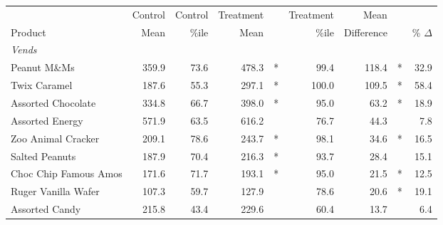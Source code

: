 \documentclass[aspectratio=169,11pt]{beamer}
\begin{document}
\begin{frame}
\begin{table}
\begin{center}
\tiny
\label{tab:nonparam}
\begin{tabular}{|l|rrrcrrcr|}
\hline
 & Control  & Control & Treatment& \hspace{-0.3in}& Treatment & Mean & \hspace{-0.3in} & \\
Product & Mean &  \%ile & Mean& \hspace{-0.3in} & \%ile &  Difference & \hspace{-0.3in}& \% $\Delta$\\
\hline \hline
\multicolumn{9}{|l|}{\emph{Vends}} \\ \hline
Peanut M\&Ms&359.9&73.6&478.3&\hspace{-0.3in}*&99.4&118.4& \hspace{-0.3in}*&32.9\\
Twix Caramel&187.6&55.3&297.1&\hspace{-0.3in}*&100.0&109.5& \hspace{-0.3in}*&58.4\\
Assorted Chocolate&334.8&66.7&398.0&\hspace{-0.3in}*&95.0&63.2& \hspace{-0.3in}*&18.9\\
Assorted Energy&571.9&63.5&616.2& \hspace{-0.3in}&76.7&44.3 & \hspace{-0.3in} &7.8\\
Zoo Animal Cracker&209.1&78.6&243.7&\hspace{-0.3in}*&98.1&34.6& \hspace{-0.3in}*&16.5\\
Salted Peanuts&187.9&70.4&216.3&\hspace{-0.3in}*&93.7&28.4 & \hspace{-0.3in} &15.1\\
Choc Chip Famous Amos&171.6&71.7&193.1&\hspace{-0.3in}*&95.0&21.5& \hspace{-0.3in}*&12.5\\
Ruger Vanilla Wafer&107.3&59.7&127.9& \hspace{-0.3in}&78.6&20.6& \hspace{-0.3in}*&19.1\\
Assorted Candy&215.8&43.4&229.6& \hspace{-0.3in}&60.4&13.7& \hspace{-0.3in}&6.4\\

\end{tabular}
\end{center}
\end{table}
\end{frame}
\end{document}
